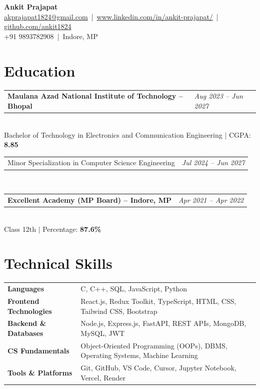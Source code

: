 \documentclass[8pt,letterpaper]{article}
\makeatletter
\newcommand{\daterow}[2]{%
  \noindent\begin{tabularx}{\textwidth}{@{}X >{\raggedright\arraybackslash}p{3.6cm}@{}}%
  \textbf{#1} & \emph{#2}\\
  \end{tabularx}%
}
\makeatother
\begin{document}
\begin{center}
{\Large \textbf{Ankit Prajapat}}\\[-1pt]
\href{mailto:akprajapat1824@gmail.com}{akprajapat1824@gmail.com} \,|\, 
\href{https://www.linkedin.com/in/ankit-prajapat/}{www.linkedin.com/in/ankit-prajapat/} \,|\, 
\href{https://github.com/ankit1824}{github.com/ankit1824}\\[0pt]
+91 9893782908 \,|\, Indore, MP
\end{center}

\section{Education}

\daterow{Maulana Azad National Institute of Technology -- Bhopal}{Aug 2023 -- Jun 2027}\\[-2pt]
Bachelor of Technology in Electronics and Communication Engineering $|$ CGPA: \textbf{8.85}\\[2pt]
\noindent\begin{tabularx}{\textwidth}{@{}X >{\raggedright\arraybackslash}p{3.6cm}@{}}%
Minor Specialization in Computer Science Engineering & \emph{Jul 2024 -- Jun 2027}\\%
\end{tabularx}\\[4pt]
\daterow{Excellent Academy (MP Board) -- Indore, MP}{Apr 2021 -- Apr 2022}\\[-2pt]
Class 12th $|$ Percentage: \textbf{87.6\%}

\section{Technical Skills}

\begin{tabularx}{\textwidth}{@{}>{\bfseries}l X@{}}
Languages & C, C++, SQL, JavaScript, Python \\

Frontend Technologies & React.js, Redux Toolkit, TypeScript, HTML, CSS, Tailwind CSS, Bootstrap \\

Backend \& Databases & Node.js, Express.js, FastAPI, REST APIs, MongoDB, MySQL, JWT \\

CS Fundamentals & Object-Oriented Programming (OOPs), DBMS, Operating Systems, Machine Learning \\

Tools \& Platforms & Git, GitHub, VS Code, Cursor, Jupyter Notebook, Vercel, Render \\
\end{tabularx}
\end{document}
